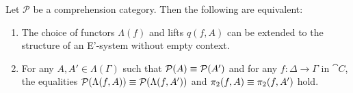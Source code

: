\begin{comment}
\begin{defn}
Let $f_0\defeq f:\Delta\to\Gamma$ be a morphism of $\cat{C}$, the base category of a
split comprehension category $\mathcal{P}$ wich a choice $j$ of cartesian lifts.
By induction we define an element $\Lambda(f,A)\in\Lambda(\Delta)$ together with
a morphism $q(f,A):\mathrm{dom}(\mathcal{P}(\Lambda(f,A)))\to 
\mathrm{dom}(\mathcal{P}(A))$, for any $A\jdeq (A_1,\ldots,A_n) 
\in\Lambda(\Gamma)$.

For $n\jdeq 0$, i.e.~if $A$ is the empty sequence, we let $\Lambda(f,A)$ be the 
empty sequence, and $q(f,A) \jdeq f$. For the inductive step, consider a 
sequence $A_1,\ldots,A_{n+1}\in \Lambda(\Gamma)$. Then we define
\begin{align*}
\Lambda(f,A) & \jdeq \mathrm{dom}(j(A_{n+1},q(f,(A_1,\ldots,A_n))))
\intertext{and}
q(f,A) & \jdeq \mathrm{dom}(\mathcal{P}(j(A_{n+1},q(f,(A_1,\ldots,A_n)))))
\end{align*}
where we consider in the definition of $q(f,A)$, $\mathrm{dom}$ to be the 
domain functor from $\cat{C}^{\to}\to\cat{C}$. 
\end{defn}

\begin{rmk}
It follows immediately from the definition of comprehension categories and the
pasting lemma of pullbacks, that the square
\begin{equation*}
\begin{tikzcd}[column sep=large]
\mathrm{dom}(\mathcal{P}(\Lambda(f,A))) \arrow[r,"{q(f,A)}"] \arrow[d,swap,"{\mathcal{P}(\Lambda(f,A))}"] & \mathrm{dom}(\mathcal{P}(A)) \arrow[d,"{\mathcal{P}(A)}"] \\
\Delta \arrow[r,"f"] & \Gamma
\end{tikzcd}
\end{equation*}
is a pullback square.
\end{rmk}
\end{comment}

\begin{thm}
Let $\mathcal{P}$ be a comprehension category. Then the following are equivalent:
\begin{enumerate}
\item The choice of functors $\Lambda(f)$ and lifts $q(f,A)$ can be extended to the 
structure of an E'-system without empty context.
\item For any
$A,A'\in\Lambda(\Gamma)$ such that $\mathcal{P}(A)\equiv\mathcal{P}(A')$
and for any $f:\Delta\to\Gamma$ in $\cat{C}$, the equalities
$\mathcal{P}(\Lambda(f,A))\equiv\mathcal{P}(\Lambda(f,A'))$ and
$\pi_2(f,A)\equiv\pi_2(f,A')$ hold. 
\end{enumerate}
\end{thm}

